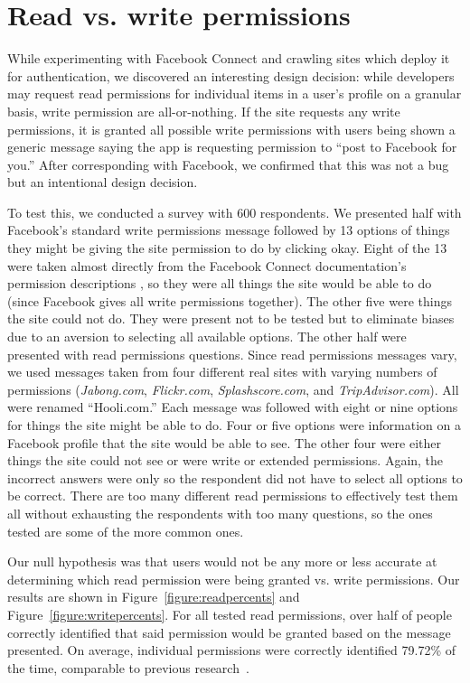 \documentclass[twoside,letterpaper]{soups-poster}
\begin{document}
\section{Read vs. write permissions}

While experimenting with Facebook Connect and crawling sites which deploy it for authentication, we discovered an interesting design decision: while developers may request read permissions for individual items in a user's profile on a granular basis, write permission are all-or-nothing.
If the site requests any write permissions, it is granted all possible write permissions with users being shown a generic message saying the app is requesting permission to ``post to Facebook for you.''
After corresponding with Facebook, we confirmed that this was not a bug but an intentional design decision.

To test this, we conducted a survey with 600 respondents.
We presented half with Facebook's standard write permissions message followed by 13 options of things they might be giving the site permission to do by clicking okay. Eight of the 13 were taken almost directly from the Facebook Connect documentation's permission descriptions \cite{fbpermissions}, so they were all things the site would be able to do (since Facebook gives all write permissions together). The other five were things the site could not do. They were present not to be tested but to eliminate biases due to an aversion to selecting all available options. 
The other half were presented with read permissions questions.
Since read permissions messages vary, we used messages taken from four different real sites with varying numbers of permissions (\emph{Jabong.com}, \emph{Flickr.com}, \emph{Splashscore.com}, and \emph{TripAdvisor.com}).
All were renamed ``Hooli.com.''
Each message was followed with eight or nine options for things the site might be able to do. Four or five options were information on a Facebook profile that the site would be able to see. The other four were either things the site could not see or were write or extended permissions. Again, the incorrect answers were only so the respondent did not have to select all options to be correct. There are too many different read permissions to effectively test them all without exhausting the respondents with too many questions, so the ones tested are some of the more common ones.

Our null hypothesis was that users would not be any more or less accurate at determining which read permission were being granted vs. write permissions.
Our results are shown in Figure~\ref{figure:readpercents} and Figure~\ref{figure:writepercents}. 
For all tested read permissions, over half of people correctly identified that said permission would be granted based on the message presented.
On average, individual permissions were correctly identified 79.72\% of the time, comparable to previous research~\cite{egelman}.
\end{document}
